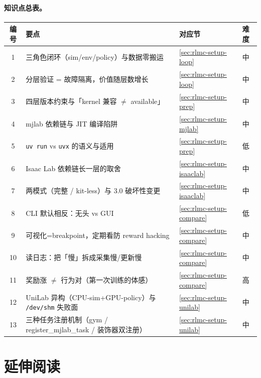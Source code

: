 \paragraph{知识点总表。}

\begin{center}
\small
\begin{tabular}{@{}clll@{}}
\toprule
编号 & 要点 & 对应节 & 难度 \\
\midrule
1 & 三角色闭环（sim/env/policy）与数据零搬运 & \cref{sec:rlmc-setup-loop} & 中 \\
2 & 分层验证 = 故障隔离，价值随层数增长 & \cref{sec:rlmc-setup-loop} & 中 \\
3 & 四层版本约束与「kernel 兼容 $\ne$ available」 & \cref{sec:rlmc-setup-prep} & 中 \\
4 & mjlab 依赖链与 JIT 编译陷阱 & \cref{sec:rlmc-setup-mjlab} & 中 \\
5 & \texttt{uv run} vs \texttt{uvx} 的语义与适用 & \cref{sec:rlmc-setup-prep} & 低 \\
6 & Isaac Lab 依赖链长一层的取舍 & \cref{sec:rlmc-setup-isaaclab} & 中 \\
7 & 两模式（完整 / kit-less）与 3.0 破坏性变更 & \cref{sec:rlmc-setup-isaaclab} & 中 \\
8 & CLI 默认相反：无头 vs GUI & \cref{sec:rlmc-setup-compare} & 低 \\
9 & 可视化=breakpoint，定期看防 reward hacking & \cref{sec:rlmc-setup-compare} & 中 \\
10 & 读日志：把「慢」拆成采集慢/更新慢 & \cref{sec:rlmc-setup-compare} & 中 \\
11 & 奖励涨 $\ne$ 行为对（第一次训练的体感） & \cref{sec:rlmc-setup-compare} & 高 \\
12 & UniLab 异构（CPU-sim+GPU-policy）与 \texttt{/dev/shm} 失败面 & \cref{sec:rlmc-setup-unilab} & 中 \\
13 & 三种任务注册机制（gym / register\_mjlab\_task / 装饰器双注册） & \cref{sec:rlmc-setup-unilab} & 中 \\
\bottomrule
\end{tabular}
\end{center}

\section{延伸阅读}
\label{sec:rlmc-setup-further}


